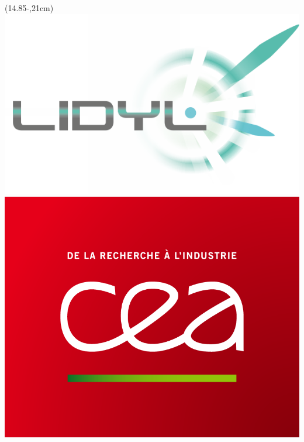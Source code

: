 \begin{textblock*}{\logocealength}(14.85\TPHorizModule-\logocealength,21cm)
\includegraphics[width=\logocealength]{Figures/Logos/lidyl.png} %
\label{Logo LIDYL}
\vspace{0.5cm}
\includegraphics[width=\logocealength]{Figures/Logos/CEA.png} %
\label{Logo CEA}
\end{textblock*}

\cleardoublepage



